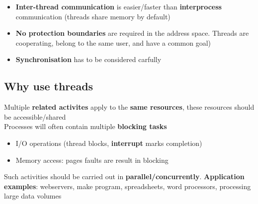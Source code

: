 \documentclass{article}
\begin{document}
\begin{itemize}
	\item \textbf{Inter-thread communication} is easier/faster than \textbf{interprocess} communication (threads share memory by default)
	\item \textbf{No protection boundaries} are required in the address space. Threads are cooperating, belong to the same user, and have a common goal)
	\item \textbf{Synchronisation} has to be considered carfully
\end{itemize}

\subsection{Why use threads}
\begin{flushleft}
Multiple \textbf{related activites} apply to the \textbf{same resources}, these resources should be accessible/shared\\
Processes will often contain multiple \textbf{blocking tasks}
\begin{itemize}
	\item I/O operations (thread blocks, \textbf{interrupt} marks completion)
	\item Memory access: pages faults are result in blocking
\end{itemize}
Such activities should be carried out in \textbf{parallel/concurrently}. \textbf{Application examples}: webservers, make program, spreadsheets, word processors, processing large data volumes
\end{flushleft}
\end{document}
